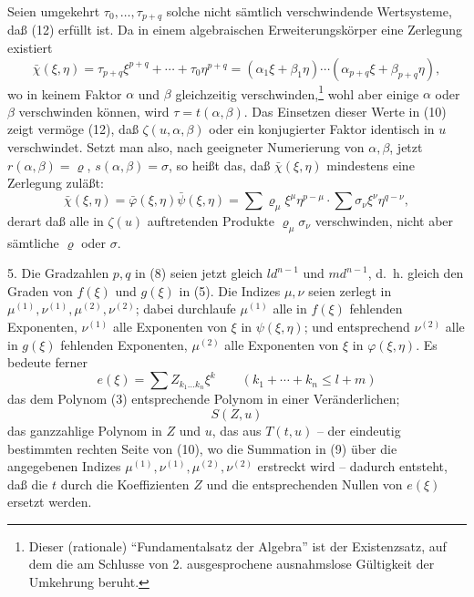Seien umgekehrt $\tau_0,\ldots,\tau_{p+q}$ solche nicht sämtlich verschwindende Wertsysteme, daß (12) erfüllt ist. Da in einem algebraischen Erweiterungskörper eine Zerlegung existiert
\begin{equation}
 \bar\chi(\xi,\eta)=\tau_{p+q}\xi^{p+q}+\cdots+\tau_0\eta^{p+q}
=(\alpha_1\xi+\beta_1\eta)\cdots(\alpha_{p+q}\xi+\beta_{p+q}\eta),
\tag{12'}
\end{equation}
wo in keinem Faktor $\alpha$ und $\beta$ gleichzeitig verschwinden,\footnote{Dieser (rationale) ``Fundamentalsatz der Algebra'' ist der Existenzsatz, auf dem die am Schlusse von 2. ausgesprochene ausnahmslose Gültigkeit der Umkehrung beruht.} wohl aber einige $\alpha$ oder $\beta$ verschwinden können, wird $\tau=t(\alpha,\beta)$. Das Einsetzen dieser Werte in (10) zeigt vermöge (12), daß $\zeta(u,\alpha,\beta)$ oder ein konjugierter Faktor identisch in $u$ verschwindet. Setzt man also, nach geeigneter Numerierung von $\alpha,\beta$, jetzt $r(\alpha,\beta)=\varrho$, $s(\alpha,\beta)=\sigma$, so heißt das, daß $\bar\chi(\xi,\eta)$ mindestens eine Zerlegung zuläßt:
\begin{equation}
\bar\chi(\xi,\eta)=\bar\varphi(\xi,\eta)\bar\psi(\xi,\eta)
=\sum \varrho_\mu\xi^\mu\eta^{p-\mu}\cdot\sum \sigma_\nu\xi^\nu\eta^{q-\nu},
\tag{13}
\end{equation}
derart daß alle in $\zeta(u)$ auftretenden Produkte $\varrho_\mu\sigma_\nu$ verschwinden, nicht aber sämtliche $\varrho$ oder $\sigma$.

5. Die Gradzahlen $p,q$ in (8) seien jetzt gleich $ld^{n-1}$ und $md^{n-1}$, d.~h. gleich den Graden von $f(\xi)$ und $g(\xi)$ in (5). Die Indizes $\mu,\nu$ seien zerlegt in $\mu^{(1)},\nu^{(1)},\mu^{(2)},\nu^{(2)}$; dabei durchlaufe $\mu^{(1)}$ alle in $f(\xi)$ fehlenden Exponenten, $\nu^{(1)}$ alle Exponenten von $\xi$ in $\psi(\xi,\eta)$; und entsprechend $\nu^{(2)}$ alle in $g(\xi)$ fehlenden Exponenten, $\mu^{(2)}$ alle Exponenten von $\xi$ in $\varphi(\xi,\eta)$. Es bedeute ferner
\[
 e(\xi)=\sum Z_{k_1\ldots k_n}\xi^k\qquad(k_1+\cdots+k_n\le l+m)
\]
das dem Polynom (3) entsprechende Polynom in einer Veränderlichen;
\[
 S(Z,u)
\]
das ganzzahlige Polynom in $Z$ und $u$, das aus $T(t,u)$ -- der eindeutig bestimmten rechten Seite von (10), wo die Summation in (9) über die angegebenen Indizes $\mu^{(1)},\nu^{(1)},\mu^{(2)},\nu^{(2)}$ erstreckt wird -- dadurch entsteht, daß die $t$ durch die Koeffizienten $Z$ und die entsprechenden Nullen von $e(\xi)$ ersetzt werden.

